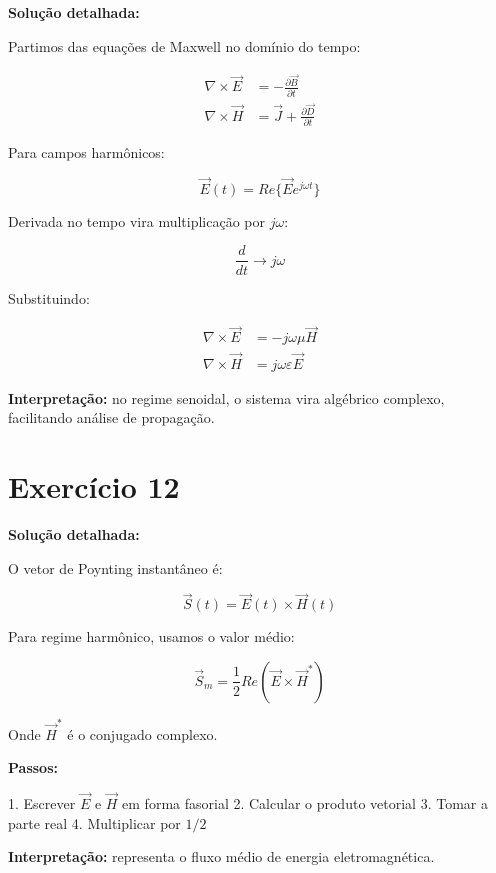 \documentclass[12pt,a4paper]{article}
\begin{document}
\textbf{Solução detalhada:}

Partimos das equações de Maxwell no domínio do tempo:

\begin{align}
\nabla \times \vec{E} &= - \frac{\partial \vec{B}}{\partial t} \\
\nabla \times \vec{H} &= \vec{J} + \frac{\partial \vec{D}}{\partial t}
\end{align}

Para campos harmônicos:

\[
\vec{E}(t) = Re\{\vec{E} e^{j\omega t}\}
\]

Derivada no tempo vira multiplicação por $j\omega$:

\[
\frac{d}{dt} \rightarrow j\omega
\]

Substituindo:

\begin{align}
\nabla \times \vec{E} &= -j\omega \mu \vec{H} \\
\nabla \times \vec{H} &= j\omega \varepsilon \vec{E}
\end{align}

\textbf{Interpretação:} no regime senoidal, o sistema vira algébrico complexo, facilitando análise de propagação.

\newpage

\section*{Exercício 12}

\textbf{Solução detalhada:}

O vetor de Poynting instantâneo é:

\[
\vec{S}(t) = \vec{E}(t) \times \vec{H}(t)
\]

Para regime harmônico, usamos o valor médio:

\[
\vec{S}_m = \frac{1}{2} Re(\vec{E} \times \vec{H}^*)
\]

Onde $\vec{H}^*$ é o conjugado complexo.

\textbf{Passos:}

1. Escrever $\vec{E}$ e $\vec{H}$ em forma fasorial
2. Calcular o produto vetorial
3. Tomar a parte real
4. Multiplicar por $1/2$

\textbf{Interpretação:} representa o fluxo médio de energia eletromagnética.

\newpage

\end{document}
